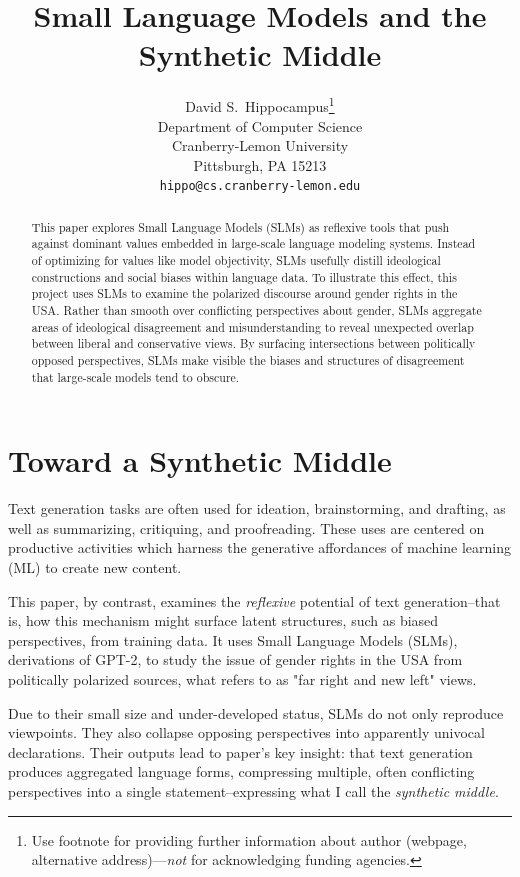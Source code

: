 \documentclass{article}
\title{Small Language Models and the Synthetic Middle}
\author{%
  David S.~Hippocampus\thanks{Use footnote for providing further information
    about author (webpage, alternative address)---\emph{not} for acknowledging
    funding agencies.} \\
  Department of Computer Science\\
  Cranberry-Lemon University\\
  Pittsburgh, PA 15213 \\
  \texttt{hippo@cs.cranberry-lemon.edu} \\
}
\begin{document}
\maketitle


\begin{abstract}
This paper explores Small Language Models (SLMs) as reflexive tools that push against dominant values embedded in large-scale language modeling systems. Instead of optimizing for values like model objectivity, SLMs usefully distill ideological constructions and social biases within language data. To illustrate this effect, this project uses SLMs to examine the polarized discourse around gender rights in the USA. Rather than smooth over conflicting perspectives about gender, SLMs aggregate areas of ideological disagreement and misunderstanding to reveal unexpected overlap between liberal and conservative views. By surfacing intersections between politically opposed perspectives, SLMs make visible the biases and structures of disagreement that large-scale models tend to obscure.
\end{abstract}

\section{Toward a Synthetic Middle}

Text generation tasks are often used for ideation, brainstorming, and drafting, as well as summarizing, critiquing, and proofreading. These uses are centered on productive activities which harness the generative affordances of machine learning (ML) to create new content. 

This paper, by contrast, examines the \textit{reflexive} potential of text generation--that is, how this mechanism might surface latent structures, such as biased perspectives, from training data. It uses Small Language Models (SLMs), derivations of GPT-2, to study the issue of gender rights in the USA from politically polarized sources, what \citet{bornschier_2021} refers to as "far right and new left" views. 

Due to their small size and under-developed status, SLMs do not only reproduce viewpoints. They also collapse opposing perspectives into apparently univocal declarations. Their outputs lead to paper's key insight: that text generation produces aggregated language forms, compressing multiple, often conflicting perspectives into a single statement--expressing what I call the \textit{synthetic middle}. 
\end{document}
